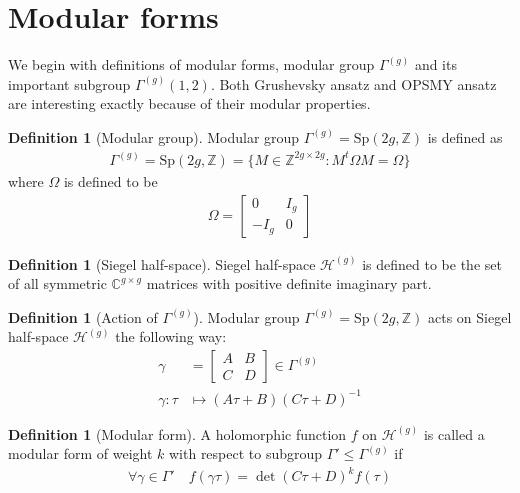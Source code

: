 \documentclass{article}
\newcommand{\ZZ}{\mathbb{Z}}
\newcommand{\CC}{\mathbb{C}}
\theoremstyle{plain}
\theoremstyle{definition}
\newtheorem{definition}[theorem]{Definition}
\begin{document}
\section{Modular forms}\label{sec:modular-forms}

We begin with definitions of modular forms, modular group $\Gamma^{(g)}$ and 
its important subgroup $\Gamma^{(g)}(1, 2)$.
Both Grushevsky ansatz and OPSMY ansatz are interesting
exactly because of their modular properties.
\begin{definition}[Modular group]
    Modular group $\Gamma^{(g)}=\text{Sp}(2g, \ZZ)$ is defined as
    \begin{align}
        \Gamma^{(g)}=\text{Sp}(2g, \ZZ) = \{ 
            M \in \ZZ^{2g \times 2g} : 
            M^t \Omega M = \Omega
        \}
    \end{align}
    where $\Omega$ is defined to be
    \begin{align}
    \Omega = 
    \begin{bmatrix}
        0 & I_g \\
        -I_g & 0
    \end{bmatrix}
    \end{align}
\end{definition}

\begin{definition}[Siegel half-space]    
    Siegel half-space $\mathcal{H}^{(g)}$ is defined to be the set of all symmetric $\CC^{g\times g}$
    matrices with positive definite imaginary part.
\end{definition}

\begin{definition}[Action of $\Gamma^{(g)}$]
    Modular group $\Gamma^{(g)}=\text{Sp}(2g, \ZZ)$ acts on Siegel half-space $\mathcal{H}^{(g)}$
    the following way:
    \begin{align}
        \gamma &= \begin{bmatrix}A & B \\ C & D\end{bmatrix} \in \Gamma^{(g)} \\
        \gamma: \tau &\mapsto (A\tau + B)(C\tau + D)^{-1}
    \end{align}
\end{definition}
\begin{definition}[Modular form]
    A holomorphic function $f$ on $\mathcal{H}^{(g)}$ is called a modular form 
    of weight $k$ with respect to subgroup $\Gamma' \le \Gamma^{(g)}$ if
    \begin{align}
        \forall \gamma \in \Gamma' \quad f(\gamma \tau) = \det (C\tau + D)^k f(\tau)
    \end{align}
\end{definition}
\end{document}
